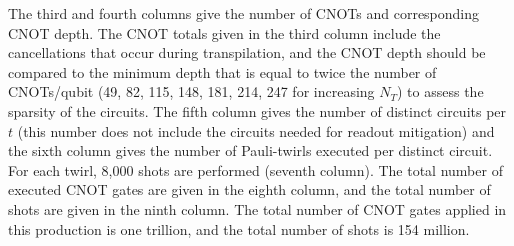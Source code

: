 \documentclass[aps, prc, tightenlines,superscriptaddress, letterpaper, amsmath, amssymb, preprintnumbers, floatfix, longbibliography, nofootinbib]{revtex4-2}
\begin{document}
\begin{table}[!tb]
{The third and fourth columns give the number of CNOTs and corresponding CNOT depth.
The CNOT totals given in the third column include the cancellations that occur during transpilation, and the CNOT depth should be compared to the minimum depth that is equal to twice the number of CNOTs/qubit (49, 82, 115, 148, 181, 214, 247 for increasing $N_T$) to assess the sparsity of the circuits. 
The fifth column gives the number of distinct circuits per $t$ (this number does not include the circuits needed for readout mitigation) and the sixth column gives the number of Pauli-twirls executed per distinct circuit.
For each twirl, 8,000 shots are performed (seventh column).
The total number of executed CNOT gates are given in the eighth column, and the total number of shots are given in the ninth column.
The total number of CNOT gates applied in this production is one trillion, and the total number of shots is 154 million.} 
 \label{tab:QsimCNOT}
\end{table}
%
\end{document}
